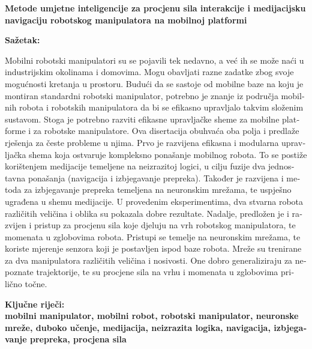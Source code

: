 

\newpage
\setlength{\parindent}{0in}
{\fontsize{14}{18}\bf {Metode umjetne inteligencije za procjenu sila interakcije i medijacijsku navigaciju robotskog manipulatora na mobilnoj platformi}}

\vskip 15mm
\begin{otherlanguage}{croatian}
\textbf{Sa\v{z}etak:\\}
   
\textnormal{Mobilni robotski manipulatori su se pojavili tek nedavno, a već ih se može naći u industrijskim okolinama i domovima. Mogu obavljati razne zadatke zbog svoje mogućnosti kretanja u prostoru. Budući da se sastoje od mobilne baze na koju je montiran standardni robotski manipulator, potrebno je znanje iz područja mobilnih robota i robotskih manipulatora da bi se efikasno upravljalo takvim složenim sustavom. Stoga je potrebno razviti efikasne upravljačke sheme za mobilne platforme i za robotske manipulatore. Ova disertacija obuhvaća oba polja i predlaže rješenja za česte probleme u njima. Prvo je razvijena efikasna i modularna upravljačka shema koja ostvaruje kompleksno ponašanje mobilnog robota. To se postiže korištenjem medijacije temeljene na neizrazitoj logici, u cilju fuzije dva jednostavna ponašanja (navigacija i izbjegavanje prepreka). Također je razvijena i metoda za izbjegavanje prepreka temeljena na neuronskim mrežama, te uspješno ugrađena u shemu medijacije. U provedenim eksperimentima, dva stvarna robota različitih veličina i oblika su pokazala dobre rezultate. Nadalje, predložen je i razvijen i pristup za procjenu sila koje djeluju na vrh robotskog manipulatora, te momenata u zglobovima robota. Pristupi se temelje na neuronskim mrežama, te koriste mjerenje senzora koji je postavljen ispod baze robota. Mreže su trenirane za dva manipulatora različitih veličina i nosivosti. One dobro generaliziraju za nepoznate trajektorije, te su procjene sila na vrhu i momenata u zglobovima prilično točne.}

\vskip 15mm
\bf{Klju\v{c}ne rije\v{c}i:\\}
\textnormal{mobilni manipulator, mobilni robot, robotski manipulator, neuronske mreže, duboko učenje, medijacija, neizrazita logika, navigacija, izbjegavanje prepreka, procjena sila}
\end{otherlanguage}